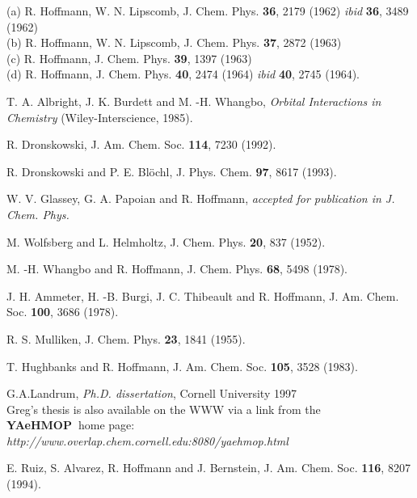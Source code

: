 \documentclass{report}
\newcommand {\prog} {\mbox {\bf {\sf YAeHMOP\ }}}
\begin{document}
\begin{thebibliography}{20}


 (a) R. Hoffmann, W. N. Lipscomb, J. Chem. Phys. {\bf 36}, 2179 (1962) {\it ibid} {\bf 36}, 3489 (1962) \\ (b) R. Hoffmann, W. N. Lipscomb, J. Chem. Phys. {\bf 37}, 2872 (1963) \\ (c) R. Hoffmann, J. Chem. Phys. {\bf 39}, 1397 (1963) \\ (d) R. Hoffmann, J. Chem. Phys. {\bf 40}, 2474 (1964) {\it ibid} {\bf 40}, 2745 (1964).

 T. A. Albright, J. K. Burdett and M. -H. Whangbo, {\it Orbital Interactions in Chemistry} (Wiley-Interscience, 1985).

 R. Dronskowski, J. Am. Chem. Soc. {\bf 114}, 7230 (1992).

 R. Dronskowski and P. E. Bl\"{o}chl, J. Phys. Chem. {\bf 97}, 8617 (1993).

 W. V. Glassey, G. A. Papoian and R. Hoffmann, {\it accepted for publication in J. Chem. Phys.}

 M. Wolfsberg and L. Helmholtz, J. Chem. Phys. {\bf 20}, 837 (1952).

 M. -H. Whangbo and R. Hoffmann, J. Chem. Phys. {\bf 68}, 5498 (1978).

 J. H. Ammeter, H. -B. Burgi, J. C. Thibeault and R. Hoffmann, J. Am. Chem. Soc. {\bf 100}, 3686 (1978).

 R. S. Mulliken, J. Chem. Phys. {\bf 23}, 1841 (1955).

 T. Hughbanks and R. Hoffmann, J. Am. Chem. Soc. {\bf 105}, 3528 (1983).

 G.A.Landrum, {\it Ph.D. dissertation}, Cornell University 1997 \\Greg's thesis is also available on the WWW via a link from the \prog home page: \\ {\it http://www.overlap.chem.cornell.edu:8080/yaehmop.html}

 E. Ruiz, S. Alvarez, R. Hoffmann and J. Bernstein, J. Am. Chem. Soc. {\bf 116}, 8207 (1994).

\end{thebibliography}
\end{document}
